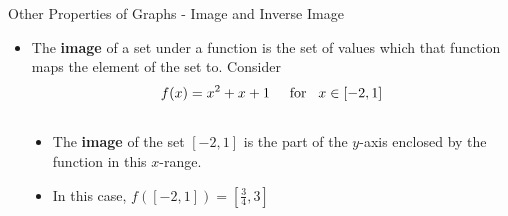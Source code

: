 \documentclass[10pt]{beamer}
\begin{document}
\begin{frame}{Other Properties of Graphs - Image and Inverse Image}
  \begin{itemize}[<+->]
    \item The \textbf{image} of a set under a function is the set of values which that function maps the element of the set to. Consider
      \begin{equation}
        f(x) = x^2 + x + 1 \hspace{5mm} \text{for} \hspace{3mm} x \in [-2,1]
      \end{equation}
  \end{itemize}

  \begin{columns}
    \begin{column}{0.5\textwidth}
    \end{column}

    \begin{column}{0.5\textwidth}
      \begin{itemize}
        \item <3-> The \textbf{image} of the set $[-2,1]$ is the part of the $y$-axis enclosed by the function in this $x$-range.
        \item <4-> In this case, $f([-2,1]) = \left[\frac{3}{4},3\right]$
      \end{itemize}
    \end{column}
  \end{columns}
\end{frame}
\end{document}
